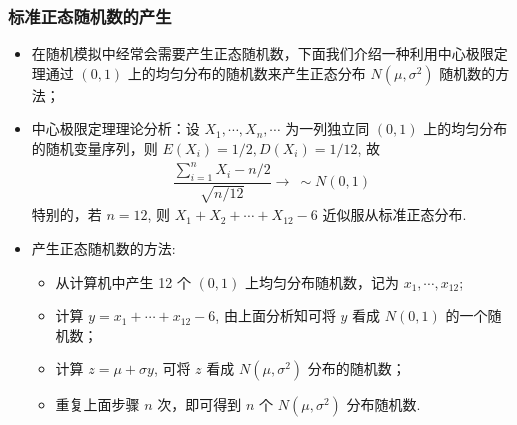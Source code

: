 \begin{frame}
	\frametitle{标准正态随机数的产生}
	\begin{itemize}[<+-|alert@+>]
		\item 在随机模拟中经常会需要产生正态随机数，下面我们介绍一种利用中心极限定理通过 $(0,1)$ 上的均匀分布的随机数来产生正态分布 $N (\mu,\sigma^2)$ 随机数的方法；
		\item 中心极限定理理论分析：设 $X_1,\cdots,X_n,\cdots$ 为一列独立同 $(0,1)$ 上的均匀分布的随机变量序列，则 $E (X_i)=1/2, D (X_i)=1/12$, 故
		\begin{eqnarray*}
			\dfrac{\sum_{i=1}^nX_i-n/2}{\sqrt{n/12}}\rightarrow~ \sim N(0,1)
		\end{eqnarray*}
		特别的，若 $n=12$, 则 $X_1+X_2+\cdots+X_{12}-6$ 近似服从标准正态分布.
		\item 产生正态随机数的方法:
		\begin{itemize}
			\item 从计算机中产生 12 个 $(0,1)$ 上均匀分布随机数，记为 $x_1,\cdots, x_{12}$;
			\item 计算 $y=x_1+\cdots+x_{12}-6$, 由上面分析知可将 $y$ 看成 $N (0,1)$ 的一个随机数；
			\item 计算 $z=\mu+\sigma y$, 可将 $z$ 看成 $N (\mu,\sigma^2)$ 分布的随机数；
			\item 重复上面步骤 $n$ 次，即可得到 $n$ 个 $N (\mu,\sigma^2)$ 分布随机数.
		\end{itemize}

	\end{itemize}
\end{frame}
